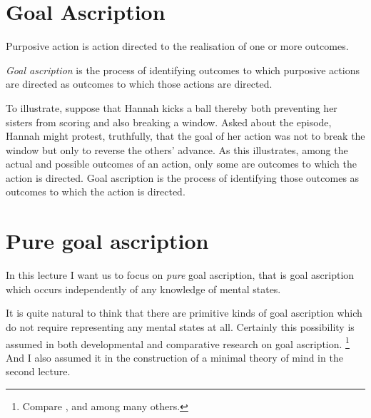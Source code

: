 \documentclass[12pt,\papersize]{extarticle}
\begin{document}
\setlength\footnotesep{1em}




\maketitle
%
%
%

\section{Goal Ascription}
Purposive action is action directed to the realisation of one or more outcomes.

\newcommand{\dfGoalAscription}{\emph{Goal ascription} is the process of identifying outcomes to which purposive actions are directed as outcomes to which those actions are directed.}

\dfGoalAscription{}


To illustrate, suppose that
Hannah kicks a ball thereby both preventing her sisters from scoring and also breaking a window.
Asked about the episode,
Hannah might protest, truthfully, that the goal of her action was not to break the window but only to reverse the others' advance.
As this illustrates,
among the actual and possible outcomes of an action,
only some are outcomes to which the action is directed.
Goal ascription is the process of identifying 
 those outcomes as outcomes to which the action is directed.


\section{Pure goal ascription}
In this lecture I want us to focus on \emph{pure} goal ascription, that is goal ascription which occurs independently of any knowledge of mental states.

It is quite natural to think that there are primitive kinds of goal ascription which do not require  representing any mental states at all.
Certainly this possibility is assumed  in both developmental and comparative research on goal ascription.%
\footnote{ 
Compare \citet{Gergely:1995sq},
	\citet{Woodward:1998dm} and
	\citet{Penn:2007ey}
among many others.
}
And I also assumed it in the construction of a minimal theory of mind in the second lecture.
\end{document}
